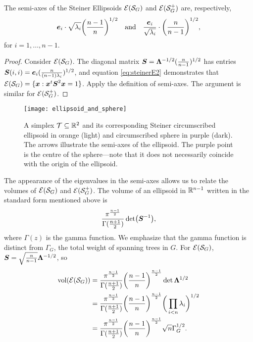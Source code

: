  \begin{lemma}
 	The semi-axes of the Steiner Ellipsoids  $\mathcal{E}(\mathcal{S}_G)$ and $\mathcal{E}(\mathcal{S}_G^+)$ are, respectively, 
 	\[\vb*{e}_i\cdot \sqrt{\lambda_i}\bigg(\frac{n-1}{n}\bigg)^{1/2}\quad\text{and}\quad\frac{\vb*{e}_i}{\sqrt{\lambda_i} }\cdot \bigg(\frac{n}{n-1}\bigg)^{1/2}, \] 
 	for $i=1,\dots,n-1$. 
 \end{lemma}
\begin{proof}
	Consider $\mathcal{E}(\mathcal{S}_G)$. The diagonal matrix $\vb*{S}=\vb{\Lambda}^{-1/2} (\frac{n}{n-1})^{1/2}$ has entries $\vb*{S}(i,i) = \vb*{e}_i(\frac{n}{(n-1)\lambda_i})^{1/2}$, and equation  \eqref{eq:steinerE2} demonstrates  that  $\mathcal{E}(\mathcal{S}_G) = \{\vb*{x}:\vb*{x}^t \vb*{S}^2\vb*{x}=1\}$. Apply the definition of semi-axes. The argument is similar for $\mathcal{E}(\mathcal{S}_G^+)$. 
\end{proof}

\begin{figure}
	\centering
	\texttt{[image: ellipsoid\_and\_sphere]}
	\caption{A simplex $\mathcal{T}\subseteq\mathbb{R}^2$ and  its corresponding Steiner circumscribed ellipsoid in orange (light) and circumscribed sphere in purple (dark). The arrows illustrate the semi-axes of the ellipsoid. The purple point is  the  centre of the sphere---note  that it does  not  necessarily coincide with the origin of the ellipsoid.}
	\label{fig:ellipsoid_and_sphere}
\end{figure}

The appearance of the  eigenvalues  in  the semi-axes allows us to relate the volumes of $\mathcal{E}(\mathcal{S}_G)$ and $\mathcal{E}(\mathcal{S}_G^+)$.  The volume of an  ellipsoid in $\mathbb{R}^{n-1}$ written in the standard  form mentioned  above is 
\begin{equation*}
\frac{\pi^{\frac{n-1}{2}}}{\Gamma(\frac{n+1}{2})} \det(\vb*{S}^{-1}),
\end{equation*}
where $\Gamma(z)$ is the gamma function.  We emphasize  that the gamma function is distinct from $\Gamma_G$, the  total weight of spanning trees in $G$.  
For $\mathcal{E}(\mathcal{S}_G)$, $\vb*{S} = \sqrt{\frac{n}{n-1}} \vb{\Lambda}^{-1/2}$, so 
\begin{align*}
\textnormal{vol}(\mathcal{E}(\mathcal{S}_G)) &= \frac{\pi^{\frac{n-1}{2}}}{\Gamma(\frac{n+1}{2})} \bigg(\frac{n-1}{n}\bigg)^{\frac{n-1}{2}} \det\vb{\Lambda}^{1/2} \\
&= \frac{\pi^{\frac{n-1}{2}}}{\Gamma(\frac{n+1}{2})} \bigg(\frac{n-1}{n}\bigg)^{\frac{n-1}{2}}\bigg(\prod_{i<n}\lambda_i\bigg)^{1/2} \\
&= \frac{\pi^{\frac{n-1}{2}}}{\Gamma(\frac{n+1}{2})} \bigg(\frac{n-1}{n}\bigg)^{\frac{n-1}{2}} \sqrt{n}\Gamma_G^{1/2}.
\end{align*}

